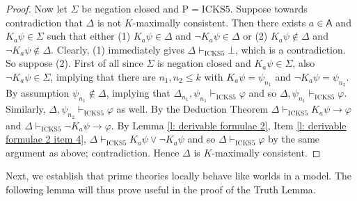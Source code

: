 \documentclass{myifcolog}
\newcommand{\K}{K}
\newcommand\A{\mathsf{A}}
\newcommand{\agi}{a}
\newcommand{\hickss}{\mathrm{ICKS5}}
\newcommand{\hickp}{\mathrm{P}}
\numberwithin{theorem}{section}
\begin{document}
\begin{proof}
Now let $\Sigma$ be negation closed and $\hickp = \hickss$. Suppose towards contradiction that $\Delta$ is not $\K$-maximally consistent. Then there exists $\agi \in \A$ and $\K_\agi \psi \in \Sigma$ such that either (1) $\K_\agi \psi \in \Delta$ and $\neg \K_\agi \psi \in \Delta$ or (2) $\K_\agi \psi \not \in \Delta$ and $\neg \K_\agi \psi \not \in \Delta$. Clearly, (1) immediately gives $\Delta \vdash_\hickss \bot$, which is a contradiction. So suppose (2). First of all since $\Sigma$ is negation closed and $\K_\agi \psi \in \Sigma$, also $\neg \K_\agi \psi \in \Sigma$, implying that there are $n_1, n_2 \leq k$ with $\K_\agi \psi = \psi_{n_1}$ and $\neg \K_\agi \psi = \psi_{n_2}$. By assumption $\psi_{n_1} \not \in \Delta$, implying that $\Delta_{n_1}, \psi_{n_1} \vdash_\hickss \varphi$ and so $\Delta, \psi_{n_1} \vdash_\hickss \varphi$. Similarly, $\Delta, \psi_{n_2} \vdash_\hickss \varphi$ as well. By the Deduction Theorem $\Delta \vdash_\hickss \K_\agi \psi \rightarrow \varphi$ and $\Delta \vdash_\hickss \neg \K_\agi \psi \rightarrow \varphi$. By Lemma \ref{l: derivable formulae 2}, Item \ref{l: derivable formulae 2 item 4}, $\Delta \vdash_\hickss \K_\agi \psi \vee \neg \K_\agi \psi$ and so $\Delta \vdash_\hickss \varphi$ by the same argument as above; contradiction. Hence $\Delta$ is $\K$-maximally consistent.
\end{proof}

Next, we establish that prime theories locally behave like worlds in a model. The following lemma will thus prove useful in the proof of the Truth Lemma.
\end{document}
